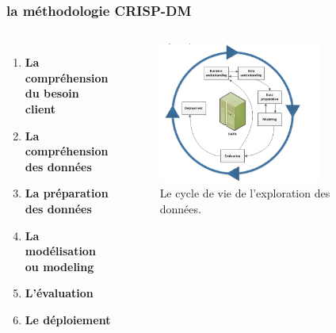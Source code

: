 \documentclass{beamer}
\begin{document}
      \begin{frame}
          \frametitle{la méthodologie CRISP-DM}
              \begin{columns}
                  \begin{enumerate}
                    \item \textbf{La compréhension du besoin client}
                    \item \textbf{La compréhension des données}
                    \item \textbf{La préparation des données} 
                    \item \textbf{La modélisation ou modeling}
                    \item \textbf{L’évaluation}
                    \item \textbf{ Le déploiement}                   
                  \end{enumerate}
             
                    \centering
                  \begin{figure}[htbp]
                        \centering
                        \includegraphics[width=0.75\textwidth]{images/crispdm.png}
                        \caption{Le cycle de vie de l'exploration des données.}
                        \label{fig:mesh1}
                \end{figure}
              \end{columns}
         
      \end{frame} 
      
      
         
     
     
    
        
   
     
      
      
\end{document}
